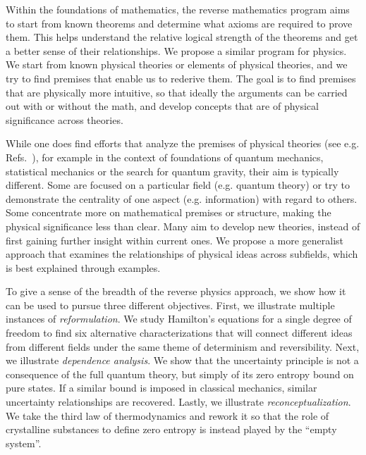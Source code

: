 \documentclass[10pt,twocolumn, nofootinbib]{revtex4-2}
\begin{document}
Within the foundations of mathematics, the reverse mathematics program\cite{friedman1976systems,simpson2017reverse,stillwellreverse} aims to start from known theorems and determine what axioms are required to prove them. This helps understand the relative logical strength of the theorems and get a better sense of their relationships. We propose a similar program for physics. We start from known physical theories or elements of physical theories, and we try to find premises that enable us to rederive them. The goal is to find premises that are physically more intuitive, so that ideally the arguments can be carried out with or without the math, and develop concepts that are of physical significance across theories.

While one does find efforts that analyze the premises of physical theories (see e.g. Refs.~\cite{chiribella2011informational, selby2021reconstructing, giles2016mathematical, boyling1972axiomatic, PhysRev.101.860, Haag1964848, axiomaticQFT1975, masanes2019measurement, carcassi2021four}), for example in the context of foundations of quantum mechanics, statistical mechanics or the search for quantum gravity, their aim is typically different. Some are focused on a particular field (e.g. quantum theory) or try to demonstrate the centrality of one aspect (e.g. information) with regard to others. Some concentrate more on mathematical premises or structure, making the physical significance less than clear. Many aim to develop new theories, instead of first gaining further insight within current ones. We propose a more generalist approach that examines the relationships of physical ideas across subfields, which is best explained through examples. 


To give a sense of the breadth of the reverse physics approach, we show how it can be used to pursue three different objectives. First, we illustrate multiple instances of \emph{reformulation}. We study Hamilton's equations for a single degree of freedom to find six alternative characterizations that will connect different ideas from different fields under the same theme of determinism and reversibility. Next, we illustrate \emph{dependence analysis}. We show that the uncertainty principle is not a consequence of the full quantum theory, but simply of its zero entropy bound on pure states. If a similar bound is imposed in classical mechanics, similar uncertainty relationships are recovered. Lastly, we illustrate \emph{reconceptualization}. We take the third law of thermodynamics and rework it so that the role of crystalline substances to define zero entropy is instead played by the ``empty system''.
\end{document}
